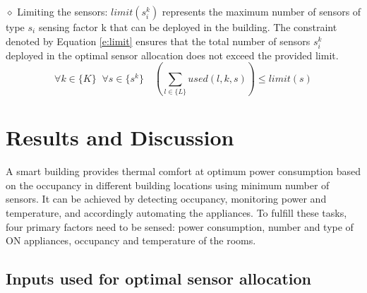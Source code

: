 \noindent $\diamond$ Limiting the sensors: $limit(s_i^k)$ represents the maximum number of sensors of type $s_i$ sensing factor k that can be deployed in the building.
The constraint denoted by Equation \eqref{e:limit} ensures that the total number of sensors $s_i^k$ deployed in the optimal sensor allocation does not exceed the provided limit.
\begin{equation}
\label{e:limit}
\forall k \in \{K\} \;\; \forall s \in \{s^k\} \quad \left(
\sum_{l \in \{L\}} used(l,k,s)
\right) \leq limit(s)
\end{equation}


\section{Results and Discussion}

A smart building provides thermal comfort at optimum power consumption based on the occupancy in different building locations using minimum number of sensors. 
It can be achieved by detecting occupancy, monitoring power and temperature, and accordingly automating the appliances.
To fulfill these tasks, four primary factors need to be sensed: power consumption, number and type of ON appliances, occupancy and temperature of the rooms.

\subsection{Inputs used for optimal sensor allocation}


